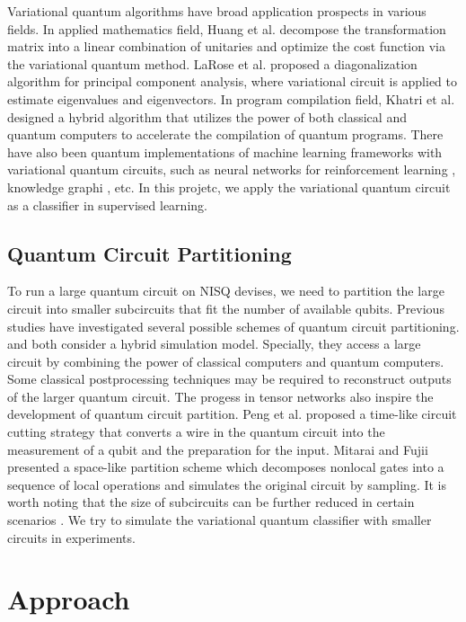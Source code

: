 \documentclass[sigconf]{acmart}
\begin{document}
Variational quantum algorithms have broad application prospects in various fields. In applied mathematics field, Huang et al. \cite{vqa-huang} decompose the transformation matrix into a linear combination of unitaries and optimize the cost function via the variational quantum method. LaRose et al. \cite{vqa-larose} proposed a diagonalization algorithm for principal component analysis, where variational circuit is applied to estimate eigenvalues and eigenvectors. In program compilation field, Khatri et al. \cite{vqa-qc} designed a hybrid algorithm that utilizes the power of both classical and quantum computers to accelerate the compilation of quantum programs. There have also been quantum implementations of machine learning frameworks with variational quantum circuits, such as neural networks for reinforcement learning \cite{vqa-rl}, knowledge graphi \cite{vqa-kg}, etc. In this projetc, we apply the variational quantum circuit as a classifier in supervised learning.

\subsection{Quantum Circuit Partitioning}
To run a large quantum circuit on NISQ devises, we need to partition the large circuit into smaller subcircuits that fit the number of available qubits. Previous studies have investigated several possible schemes of quantum circuit partitioning. \cite{bravyi2016} and \cite{tang2021} both consider a hybrid simulation model. Specially, they access a large circuit by combining the power of classical computers and quantum computers. Some classical postprocessing techniques may be required to reconstruct outputs of the larger quantum circuit. The progess in tensor networks also inspire the development of quantum circuit partition. Peng et al. \cite{peng2020} proposed a time-like circuit cutting strategy that converts a wire in the quantum circuit into the measurement of a qubit and the preparation for the input. Mitarai and Fujii \cite{mitarai2021} presented a space-like partition scheme which decomposes nonlocal gates into a sequence of local operations and simulates the original circuit by sampling. It is worth noting that the size of subcircuits can be further reduced in certain scenarios \cite{marshall2022high}. We try to simulate the variational quantum classifier with smaller circuits in experiments.

\section{Approach}
\end{document}
